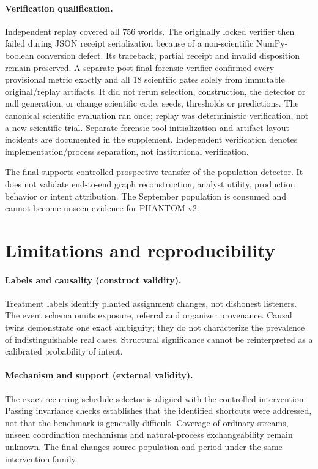 \documentclass[sigconf,nonacm]{acmart}
\begin{document}
\paragraph{Verification qualification.} Independent replay covered all 756 worlds. The originally locked verifier then failed during JSON receipt serialization because of a non-scientific NumPy-boolean conversion defect. Its traceback, partial receipt and invalid disposition remain preserved. A separate post-final forensic verifier confirmed every provisional metric exactly and all 18 scientific gates solely from immutable original/replay artifacts. It did not rerun selection, construction, the detector or null generation, or change scientific code, seeds, thresholds or predictions. The canonical scientific evaluation ran once; replay was deterministic verification, not a new scientific trial. Separate forensic-tool initialization and artifact-layout incidents are documented in the supplement. Independent verification denotes implementation/process separation, not institutional verification.

The final supports controlled prospective transfer of the population detector. It does not validate end-to-end graph reconstruction, analyst utility, production behavior or intent attribution. The September population is consumed and cannot become unseen evidence for PHANTOM v2.

\section{Limitations and reproducibility}
\paragraph{Labels and causality (construct validity).} Treatment labels identify planted assignment changes, not dishonest listeners. The event schema omits exposure, referral and organizer provenance. Causal twins demonstrate one exact ambiguity; they do not characterize the prevalence of indistinguishable real cases. Structural significance cannot be reinterpreted as a calibrated probability of intent.

\paragraph{Mechanism and support (external validity).} The exact recurring-schedule selector is aligned with the controlled intervention. Passing invariance checks establishes that the identified shortcuts were addressed, not that the benchmark is generally difficult. Coverage of ordinary streams, unseen coordination mechanisms and natural-process exchangeability remain unknown. The final changes source population and period under the same intervention family.
\end{document}

